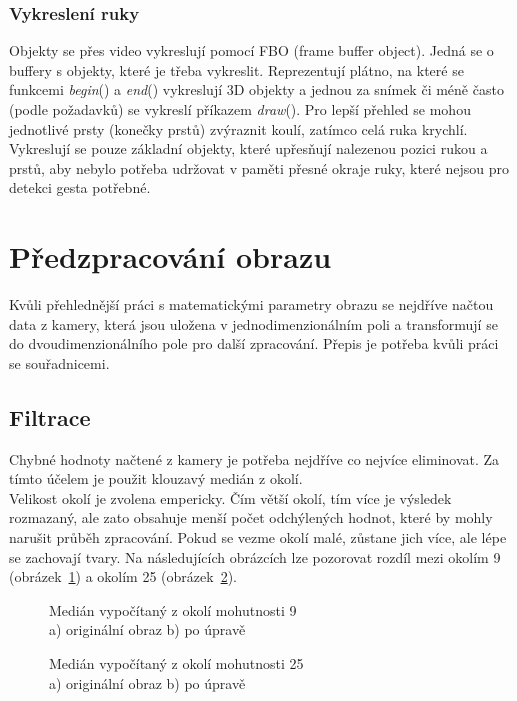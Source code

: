\subsubsection{Vykreslení ruky}
Objekty se přes video vykreslují pomocí FBO (frame buffer object). Jedná se o buffery s objekty, které je třeba vykreslit. Reprezentují plátno, na které se funkcemi \textit{begin}() a \textit{end}() vykreslují 3D objekty a jednou za snímek či méně často (podle požadavků) se vykreslí příkazem \textit{draw}(). Pro lepší přehled se mohou jednotlivé prsty (konečky prstů) zvýraznit koulí, zatímco celá ruka krychlí. Vykreslují se pouze základní objekty, které upřesňují nalezenou pozici rukou a prstů, aby nebylo potřeba udržovat v paměti přesné okraje ruky, které nejsou pro detekci gesta potřebné.

\section{Předzpracování obrazu}

Kvůli přehlednější práci s matematickými parametry obrazu se nejdříve načtou data z kamery, která jsou uložena v jednodimenzionálním poli a transformují se do dvoudimenzionálního pole pro další zpracování. Přepis je potřeba kvůli práci se souřadnicemi.\\

\subsection{Filtrace}
Chybné hodnoty načtené z kamery je potřeba nejdříve co nejvíce eliminovat. Za tímto účelem je použit klouzavý medián z okolí.\\

Velikost okolí je zvolena empericky. Čím větší okolí, tím více je výsledek rozmazaný, ale zato obsahuje menší počet odchýlených hodnot, které by mohly narušit průběh zpracování. Pokud se vezme okolí malé, zůstane jich více, ale lépe se zachovají tvary. Na následujících obrázcích lze pozorovat rozdíl mezi okolím 9 (obrázek~\ref{pic10}) a okolím 25 (obrázek~\ref{pic11}).\\

\begin{figure}[htp]
\centering
{} \hfil
{}
\caption{Medián vypočítaný z okolí mohutnosti 9 \\ a) originální obraz b) po úpravě}
\label{pic10}
\end{figure}
\begin{figure}[htp]
\centering
{} \hfil
{}
\caption{Medián vypočítaný z okolí mohutnosti 25 \\ a) originální obraz b) po úpravě}
\label{pic11}
\end{figure}

